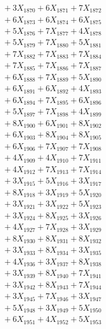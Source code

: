 \documentclass[a4paper,10pt]{article}
\begin{document}
{\begin{align}
&\;  + 3 X_{1870} + 6 X_{1871} + 7 X_{1872} \\[0.3ex]
&\;  + 6 X_{1873} + 6 X_{1874} + 6 X_{1875} \\[0.3ex]
&\;  + 5 X_{1876} + 7 X_{1877} + 4 X_{1878} \\[0.3ex]
&\;  + 5 X_{1879} + 7 X_{1880} + 5 X_{1881} \\[0.3ex]
&\;  + 7 X_{1882} + 7 X_{1883} + 7 X_{1884} \\[0.3ex]
&\;  + 7 X_{1885} + 7 X_{1886} + 7 X_{1887} \\[0.3ex]
&\;  + 6 X_{1888} + 7 X_{1889} + 5 X_{1890} \\[0.3ex]
&\;  + 6 X_{1891} + 6 X_{1892} + 4 X_{1893} \\[0.3ex]
&\;  + 6 X_{1894} + 7 X_{1895} + 6 X_{1896} \\[0.3ex]
&\;  + 5 X_{1897} + 7 X_{1898} + 4 X_{1899} \\[0.5ex]\allowbreak
&\;  + 8 X_{1900} + 6 X_{1901} + 8 X_{1902} \\[0.3ex]
&\;  + 6 X_{1903} + 8 X_{1904} + 8 X_{1905} \\[0.3ex]
&\;  + 6 X_{1906} + 7 X_{1907} + 7 X_{1908} \\[0.3ex]
&\;  + 4 X_{1909} + 4 X_{1910} + 7 X_{1911} \\[0.3ex]
&\;  + 4 X_{1912} + 7 X_{1913} + 7 X_{1914} \\[0.3ex]
&\;  + 3 X_{1915} + 5 X_{1916} + 3 X_{1917} \\[0.3ex]
&\;  + 8 X_{1918} + 3 X_{1919} + 5 X_{1920} \\[0.3ex]
&\;  + 3 X_{1921} + 3 X_{1922} + 5 X_{1923} \\[0.3ex]
&\;  + 3 X_{1924} + 8 X_{1925} + 3 X_{1926} \\[0.3ex]
&\;  + 4 X_{1927} + 7 X_{1928} + 3 X_{1929} \\[0.5ex]\allowbreak
&\;  + 8 X_{1930} + 8 X_{1931} + 8 X_{1932} \\[0.3ex]
&\;  + 3 X_{1933} + 8 X_{1934} + 3 X_{1935} \\[0.3ex]
&\;  + 4 X_{1936} + 3 X_{1937} + 8 X_{1938} \\[0.3ex]
&\;  + 3 X_{1939} + 8 X_{1940} + 7 X_{1941} \\[0.3ex]
&\;  + 3 X_{1942} + 8 X_{1943} + 7 X_{1944} \\[0.3ex]
&\;  + 3 X_{1945} + 7 X_{1946} + 3 X_{1947} \\[0.3ex]
&\;  + 5 X_{1948} + 3 X_{1949} + 5 X_{1950} \\[0.3ex]
&\;  + 6 X_{1951} + 4 X_{1952} + 5 X_{1953} \\[0.3ex]

\end{align}}
\end{document}

